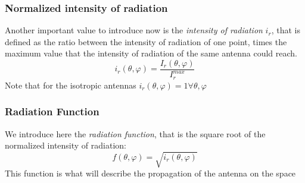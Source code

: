 \subsubsection*{Normalized intensity of radiation}
Another important value to introduce now is the \emph{intensity of radiation} $i_r$, that is defined as the ratio between the intensity of radiation of one point, times the maximum value that the intensity of radiation of the same antenna could reach.
\begin{equation}
    i_r(\theta,\varphi)=\frac{I_r(\theta,\varphi)}{I_r^{max}}
\end{equation}
Note that for the isotropic antennas $i_r(\theta,\varphi)=1 \forall \theta,\varphi$
\subsubsection*{Radiation Function}
We introduce here the \emph{radiation function}, that is the square root of the normalized intensity of radiation:
\begin{equation}
    f(\theta,\varphi)=\sqrt{i_r(\theta,\varphi)}
\end{equation}
This function is what will describe the propagation of the antenna on the space
